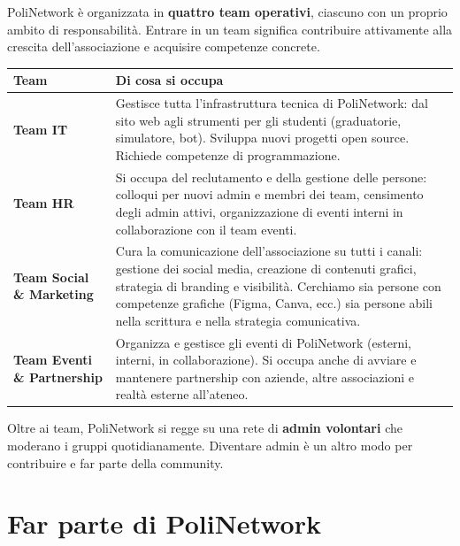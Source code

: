 \documentclass[report]{core/polinetwork}
\begin{document}
PoliNetwork è organizzata in \textbf{quattro team operativi},
ciascuno con un proprio ambito di responsabilità. Entrare in un
team significa contribuire attivamente alla crescita
dell'associazione e acquisire competenze concrete.

\vspace{8pt}

\begin{center}
\renewcommand{\arraystretch}{1.6}
\begin{tabularx}{\textwidth}{>{\bfseries\color{pn-primary}}l X}
\toprule
\textbf{Team} & \textbf{Di cosa si occupa} \\
\midrule
Team IT &
Gestisce tutta l'infrastruttura tecnica di PoliNetwork: dal
sito web agli strumenti per gli studenti (graduatorie, simulatore,
bot). Sviluppa nuovi progetti open source. Richiede competenze
di programmazione. \\
\addlinespace
Team HR &
Si occupa del reclutamento e della gestione delle persone:
colloqui per nuovi admin e membri dei team, censimento degli
admin attivi, organizzazione di eventi interni in collaborazione
con il team eventi. \\
\addlinespace
Team Social \& Marketing &
Cura la comunicazione dell'associazione su tutti i canali: gestione
dei social media, creazione di contenuti grafici, strategia di
branding e visibilità. Cerchiamo sia persone con competenze
grafiche (Figma, Canva, ecc.) sia persone abili nella scrittura
e nella strategia comunicativa. \\
\addlinespace
Team Eventi \& Partnership &
Organizza e gestisce gli eventi di PoliNetwork (esterni, interni,
in collaborazione). Si occupa anche di avviare e mantenere
partnership con aziende, altre associazioni e realtà esterne
all'ateneo. \\
\bottomrule
\end{tabularx}
\end{center}

\vspace{6pt}

Oltre ai team, PoliNetwork si regge su una rete di
\textbf{admin volontari} che moderano i gruppi quotidianamente.
Diventare admin è un altro modo per contribuire e far parte della
community.

\section{Far parte di PoliNetwork}
\end{document}
